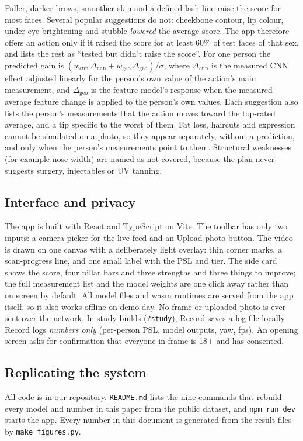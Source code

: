 \documentclass[sigconf,nonacm]{acmart}
\begin{document}
Fuller, darker brows, smoother skin and a defined lash line raise the score for most faces. Several popular
suggestions do not: cheekbone contour, lip colour, under-eye brightening and stubble \emph{lowered} the average
score. The app therefore offers an action only if it raised the score for at least 60\% of test faces of that sex,
and lists the rest as ``tested but didn't raise the score''. For one person the predicted gain is
$(w_{\text{cnn}}\,\Delta_{\text{cnn}} + w_{\text{geo}}\,\Delta_{\text{geo}})/\sigma$, where $\Delta_{\text{cnn}}$ is the
measured CNN effect adjusted linearly for the person's own value of the action's main measurement, and
$\Delta_{\text{geo}}$ is the feature model's response when the measured average feature change is applied to the
person's own values. Each suggestion also lists the person's measurements that the action moves toward the
top-rated average, and a tip specific to the worst of them. Fat loss, haircuts and expression cannot be
simulated on a photo, so they appear separately, without a prediction, and only when the person's measurements
point to them. Structural weaknesses (for example nose width) are named as not covered, because the plan never
suggests surgery, injectables or UV tanning.

\subsection{Interface and privacy}
The app is built with React and TypeScript on Vite. The toolbar has only two inputs: a camera picker for the
live feed and an Upload photo button. The video is drawn on one canvas with a deliberately light overlay: thin corner marks, a
scan-progress line, and one small label with the PSL and tier. The side card shows the score, four pillar
bars and three strengths and three things to improve; the full measurement list and the model weights are
one click away rather than on screen by default. All model files and wasm
runtimes are served from the app itself, so it also works offline on demo day. No frame or uploaded photo is
ever sent over the network. In study builds (\texttt{?study}), Record saves a log file locally. Record logs \emph{numbers only} (per-person PSL, model
outputs, yaw, fps). An opening screen asks for confirmation that everyone in frame is 18+ and has consented.

\subsection{Replicating the system}
All code is in our repository. \texttt{README.md} lists the nine commands that rebuild every model and
number in this paper from the public dataset, and \texttt{npm run dev} starts the app. Every number in this
document is generated from the result files by \texttt{make\_figures.py}.
\end{document}
